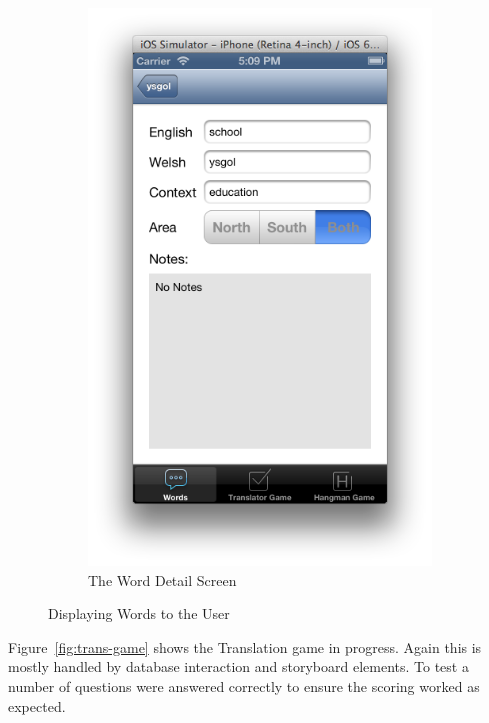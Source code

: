 \documentclass[11pt, a4paper]{article}
\begin{document}
\begin{figure}[h]
\begin{subfigure}[b]{0.3\textwidth}
\includegraphics[width=\textwidth]{img/word-detail}
\caption{The Word Detail Screen}
\end{subfigure}
\caption{Displaying Words to the User}
\label{fig:display-words}
\end{figure}

Figure~\ref{fig:trans-game} shows the Translation game in progress. Again this is mostly handled by database interaction and storyboard elements. To test a number of questions were answered correctly to ensure the scoring worked as expected.
\end{document}
